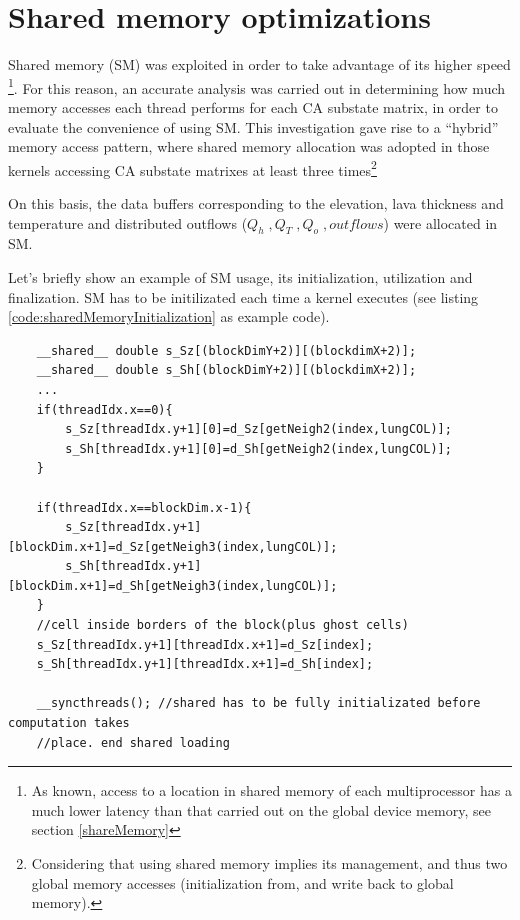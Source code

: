 \section{Shared memory optimizations}\label{sect:sharedMemoryOptimization}
Shared memory (SM) was exploited in order to take advantage of its higher
speed \footnote{As known, access to a location in 
shared memory of each multiprocessor has 
a much lower latency than that carried out 
on the global device memory, see section \ref{shareMemory}}.
For this 
reason, an accurate analysis was carried out in 
determining how much memory accesses each 
thread performs for each CA substate matrix, 
in order to evaluate the convenience of using SM. This 
investigation gave rise to a ``hybrid'' memory access pattern, where shared memory 
allocation was adopted in those kernels accessing CA substate matrixes at least
three times\footnote{Considering that using shared memory implies its
management, and thus two global memory accesses (initialization from, and write
back to global memory).}

On this basis, the data buffers corresponding to the elevation, lava thickness
and temperature and distributed outflows (\(Q_h \;, Q_T \;, 
Q_o\;, outflows \)) were allocated in SM.

Let's briefly show an example of SM usage, its initialization,
utilization and finalization.
SM has to be initilizated each time a kernel executes (see listing
\ref{code:sharedMemoryInitialization} as example code).

\begin{lstlisting}
	__shared__ double s_Sz[(blockDimY+2)][(blockdimX+2)];
	__shared__ double s_Sh[(blockDimY+2)][(blockdimX+2)];
	... 
	if(threadIdx.x==0){
		s_Sz[threadIdx.y+1][0]=d_Sz[getNeigh2(index,lungCOL)];
		s_Sh[threadIdx.y+1][0]=d_Sh[getNeigh2(index,lungCOL)];
	}

	if(threadIdx.x==blockDim.x-1){
		s_Sz[threadIdx.y+1][blockDim.x+1]=d_Sz[getNeigh3(index,lungCOL)];
		s_Sh[threadIdx.y+1][blockDim.x+1]=d_Sh[getNeigh3(index,lungCOL)];
	}
	//cell inside borders of the block(plus ghost cells)
	s_Sz[threadIdx.y+1][threadIdx.x+1]=d_Sz[index];
	s_Sh[threadIdx.y+1][threadIdx.x+1]=d_Sh[index];

	__syncthreads(); //shared has to be fully initializated before computation takes
	//place. end shared loading
\end{lstlisting}

